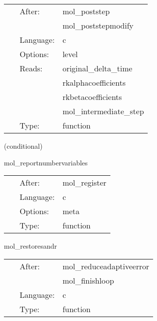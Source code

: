 \hspace{5mm}

 \begin{tabular*}{160mm}{cll} 
~ & After:  & mol\_poststep \\ 
~& ~ &mol\_poststepmodify\\ 
~ & Language:  & c \\ 
~ & Options:  & level \\ 
~ & Reads:  & original\_delta\_time \\ 
~& ~ &rkalphacoefficients\\ 
~& ~ &rkbetacoefficients\\ 
~& ~ &mol\_intermediate\_step\\ 
~ & Type:  & function \\ 
\end{tabular*} 


\vspace{5mm}

   (conditional) 

\hspace{5mm} mol\_reportnumbervariables 

\hspace{5mm}{\it report how many of each type of variable there are } 


\hspace{5mm}

 \begin{tabular*}{160mm}{cll} 
~ & After:  & mol\_register \\ 
~ & Language:  & c \\ 
~ & Options:  & meta \\ 
~ & Type:  & function \\ 
\end{tabular*} 


\vspace{5mm}


\hspace{5mm} mol\_restoresandr 

\hspace{5mm}{\it restoring the save and restore variables to the original state } 


\hspace{5mm}

 \begin{tabular*}{160mm}{cll} 
~ & After:  & mol\_reduceadaptiveerror \\ 
~& ~ &mol\_finishloop\\ 
~ & Language:  & c \\ 
~ & Type:  & function \\ 
\end{tabular*} 


